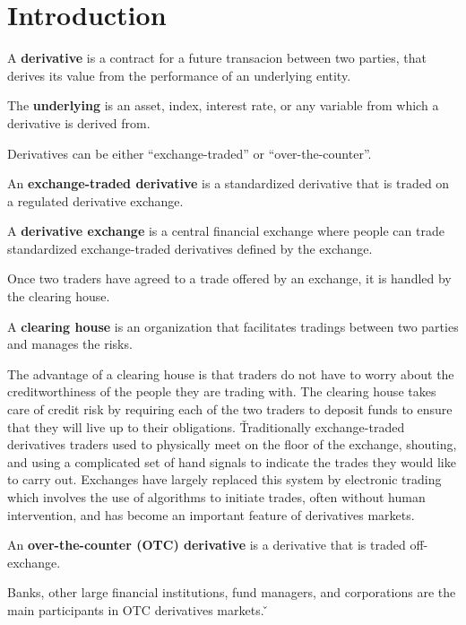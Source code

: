 \section{Introduction}

\bd[Derivative]
A \textbf{derivative} is a contract for a future transacion between two parties, that derives its value from the
performance of an underlying entity.
\ed

\bd[Underlying]
The \textbf{underlying} is an asset, index, interest rate, or any variable from which a derivative is derived from.
\ed

Derivatives can be either ``exchange-traded'' or ``over-the-counter''.

An \textbf{exchange-traded derivative} is a standardized derivative that is traded on a regulated derivative exchange.
\ed

A \textbf{derivative exchange} is a central financial exchange where people can trade standardized exchange-traded
derivatives defined by the exchange.
\ed

Once two traders have agreed to a trade offered by an exchange, it is handled by the clearing house.

A \textbf{clearing house} is an organization that facilitates tradings between two parties and manages the risks.
\ed

The advantage of a clearing house is that traders do not have to worry about the creditworthiness of the people they
are trading with. The clearing house takes care of credit risk by requiring each of the two traders to deposit funds
to ensure that they will live up to their obligations. \v

Traditionally exchange-traded derivatives traders used to physically meet on the floor of the exchange, shouting, and
using a complicated set of hand signals to indicate the trades they would like to carry out. Exchanges have largely
replaced this system by electronic trading which involves the use of algorithms to initiate trades, often without human
intervention, and has become an important feature of derivatives markets.

An \textbf{over-the-counter (OTC) derivative} is a derivative that is traded off-exchange.
\ed

Banks, other large financial institutions, fund managers, and corporations are the main participants in OTC derivatives
markets. \v


